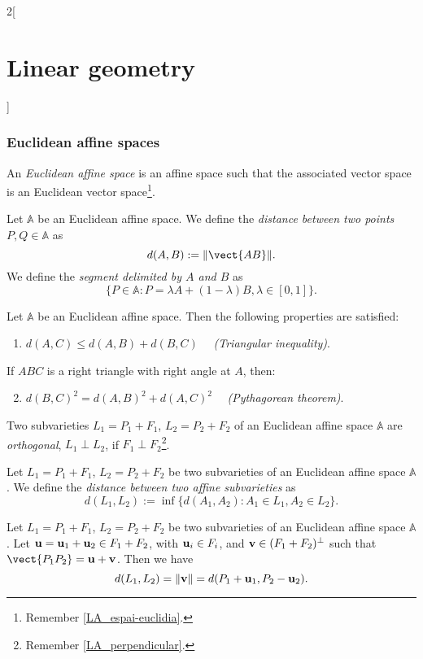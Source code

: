 \documentclass[../../../main.tex]{subfiles}
\begin{document}
\begin{multicols}{2}[\section{Linear geometry}]
  \subsubsection{Euclidean affine spaces}
  \begin{definition}
    An \textit{Euclidean affine space} is an affine space such that the associated vector space is an Euclidean vector space\footnote{Remember \cref{LA_espai-euclidia}.}.
  \end{definition}
  \begin{definition}
    Let $\mathbb{A}$ be an Euclidean affine space. We define the \textit{distance between two points $P,Q\in\mathbb{A}$} as $$d(A,B):=\|\vect{AB}\|.$$ We define the \textit{segment delimited by $A$ and $B$} as $$\{P\in\mathbb{A}:P=\lambda A+(1-\lambda)B,\lambda\in[0,1]\}.$$
  \end{definition}
  \begin{prop}
    Let $\mathbb{A}$ be an Euclidean affine space. Then the following properties are satisfied:
    \begin{enumerate}
      \item $d(A,C)\leq d(A,B)+d(B,C)\quad$ \textit{(Triangular inequality)}.
    \end{enumerate}
    If $ABC$ is a right triangle with right angle at $A$, then:
    \begin{enumerate}
      \setcounter{enumi}{1}
      \item $d(B,C)^2=d(A,B)^2+d(A,C)^2\quad$ \textit{(Pythagorean theorem)}.
    \end{enumerate}
  \end{prop}
  \begin{definition}
    Two subvarieties $L_1=P_1+F_1$, $L_2=P_2+F_2$ of an Euclidean affine space $\mathbb{A}$ are \textit{orthogonal}, $L_1\perp L_2$, if $F_1\perp F_2$\footnote{Remember \cref{LA_perpendicular}.}.
  \end{definition}
  \begin{definition}
    Let $L_1=P_1+F_1$, $L_2=P_2+F_2$ be two subvarieties of an Euclidean affine space $\mathbb{A}$. We define the \textit{distance between two affine subvarieties} as $$d(L_1,L_2):=\inf\{d(A_1,A_2):A_1\in L_1, A_2\in L_2\}.$$
  \end{definition}
  \begin{theorem}
    Let $L_1=P_1+F_1$, $L_2=P_2+F_2$ be two subvarieties of an Euclidean affine space $\mathbb{A}$. Let $\boldsymbol{\mathrm{u}}=\boldsymbol{\mathrm{u}}_1+\boldsymbol{\mathrm{u}}_2\in F_1+F_2$, with $\boldsymbol{\mathrm{u}}_i\in F_i$, and $\boldsymbol{\mathrm{v}}\in(F_1+F_2)^\perp$ such that $\vect{P_1P_2}=\vectorfunction{u}+\vectorfunction{v}$. Then we have $$d(L_1,L_2)=\|\boldsymbol{\mathrm{v}}\|=d(P_1+\boldsymbol{\mathrm{u}}_1,P_2-\boldsymbol{\mathrm{u}}_2).$$
  \end{theorem}

\end{multicols}
\end{document}
